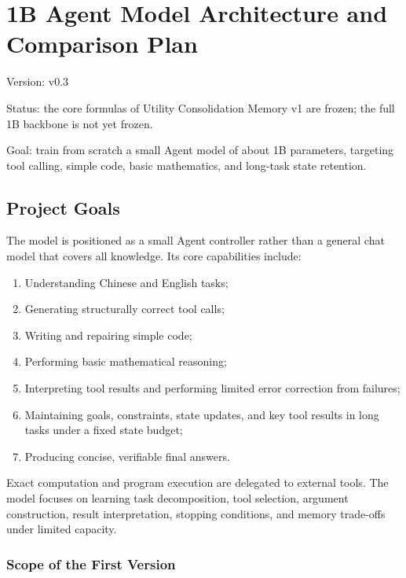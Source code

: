 \section{1B Agent Model Architecture and Comparison Plan}

\begin{notesquote}
Version: v0.3

Status: the core formulas of Utility Consolidation Memory v1 are frozen; the full 1B backbone is not yet frozen.

Goal: train from scratch a small Agent model of about 1B parameters, targeting tool calling, simple code, basic mathematics, and long-task state retention.
\end{notesquote}

\subsection{Project Goals}

The model is positioned as a small Agent controller rather than a general chat model that covers all knowledge. Its core capabilities include:

\begin{enumerate}
  \item Understanding Chinese and English tasks;
  \item Generating structurally correct tool calls;
  \item Writing and repairing simple code;
  \item Performing basic mathematical reasoning;
  \item Interpreting tool results and performing limited error correction from failures;
  \item Maintaining goals, constraints, state updates, and key tool results in long tasks under a fixed state budget;
  \item Producing concise, verifiable final answers.
\end{enumerate}

Exact computation and program execution are delegated to external tools. The model focuses on learning task decomposition, tool selection, argument construction, result interpretation, stopping conditions, and memory trade-offs under limited capacity.

\subsubsection{Scope of the First Version}

